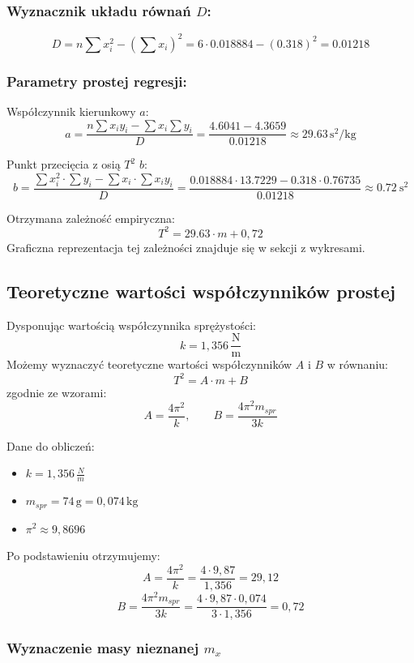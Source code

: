 \documentclass[a4paper,12pt]{article}
\begin{document}
\subsubsection*{Wyznacznik układu równań $D$:}
\[
    D = n \sum x_i^2 - (\sum x_i)^2 = 6 \cdot 0.018884 - (0.318)^2 = 0.01218
\]

\subsubsection*{Parametry prostej regresji:}

Współczynnik kierunkowy \( a \):
\[
    a = \frac{n \sum x_i y_i - \sum x_i \sum y_i}{D} = \frac{4.6041 - 4.3659}{0.01218} \approx 29.63 \, \text{s}^2/\text{kg}
\]

Punkt przecięcia z osią $T^2$ \( b \):
\[
    b = \frac{\sum x_i^2 \cdot \sum y_i - \sum x_i \cdot \sum x_i y_i}{D} = \frac{0.018884 \cdot 13.7229 - 0.318 \cdot 0.76735}{0.01218} \approx 0.72 \ \text{s}^2
\]

Otrzymana zależność empiryczna:
\[
    T^2 = 29.63 \cdot m + 0,72
\]
Graficzna reprezentacja tej zależności znajduje się w sekcji z wykresami.

\subsection*{Teoretyczne wartości współczynników prostej}
Dysponując wartością współczynnika sprężystości: \[
    k = 1{,}356 \, \frac{\text{N}}{\text{m}}
\]
Możemy wyznaczyć teoretyczne wartości współczynników $A$ i $B$ w równaniu:
\[
    T^2 = A \cdot m + B
\]
zgodnie ze wzorami:
\[
    A = \frac{4\pi^2}{k}, \qquad B = \frac{4\pi^2 m_{spr}}{3k}
\]

Dane do obliczeń:
\begin{itemize}
    \item \( k = 1{,}356 \, \frac{N}{m} \)
    \item \( m_{spr} = 74 \, \text{g} = 0{,}074 \, \text{kg} \)
    \item \( \pi^2 \approx 9{,}8696 \)
\end{itemize}

Po podstawieniu otrzymujemy:
\[
    A = \frac{4\pi^2}{k}=\frac{4\cdot9,87}{1,356}= 29,12
\]
\[
    B = \frac{4\pi^2 m_{spr}}{3k}=\frac{4\cdot 9,87\cdot 0,074}{3\cdot1,356}=0,72
\]

\subsubsection*{Wyznaczenie masy nieznanej $m_x$}
\end{document}
